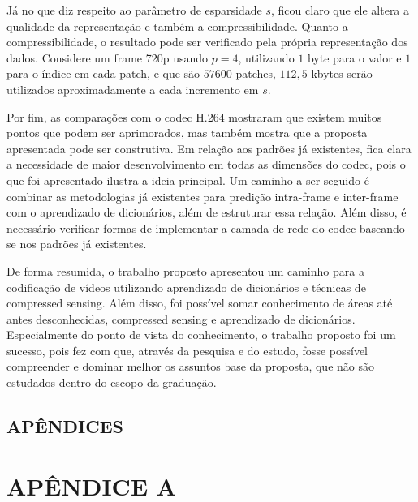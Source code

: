 \documentclass[cic,tc]{iiufrgs}
\begin{document}
Já no que diz respeito ao parâmetro de esparsidade $s$, ficou claro que ele altera a qualidade da representação 
e também a compressibilidade.
Quanto a compressibilidade, o resultado pode ser verificado pela própria representação dos dados.
Considere um frame 720p usando $p=4$, utilizando $1$ byte para o valor e $1$ para o índice em cada 
patch, e que são $57600$ patches, $112,5$ kbytes serão utilizados aproximadamente a cada incremento
em $s$.

Por fim, as comparações com o codec H.264 mostraram que existem muitos pontos que podem ser 
aprimorados, mas também mostra que a proposta apresentada pode ser construtiva.
Em relação aos padrões já existentes, fica clara a necessidade de maior desenvolvimento em 
todas as dimensões do codec, pois o que foi apresentado ilustra a ideia principal.
Um caminho a ser seguido é combinar as metodologias já existentes para predição intra-frame 
e inter-frame com o aprendizado de dicionários, além de estruturar essa relação.
Além disso, é necessário verificar formas de implementar a camada de rede do codec baseando-se 
nos padrões já existentes.

De forma resumida, o trabalho proposto apresentou um caminho para a codificação de vídeos 
utilizando aprendizado de dicionários e técnicas de compressed sensing.
Além disso, foi possível somar conhecimento de áreas até antes desconhecidas, 
compressed sensing e aprendizado de dicionários.
Especialmente do ponto de vista do conhecimento, o trabalho proposto foi um sucesso, 
pois fez com que, através da pesquisa e do estudo, fosse possível compreender e dominar 
melhor os assuntos base da proposta, que não são estudados dentro do escopo da graduação.


% 




\section*{APÊNDICES}
\chapter*{APÊNDICE A}
\end{document}
